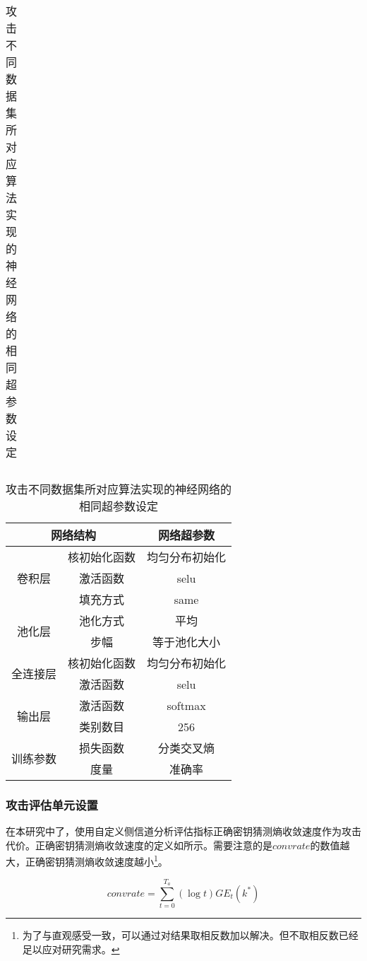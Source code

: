 {\begin{table}[!htb]
{\begin{subtable}[t]{\textwidth}
\begin{tabular}{cc|cccccc}
				\end{tabular}   
			\end{subtable}
		}
		
		\normalsize{
			\begin{subtable}[t]{\textwidth}
				\caption{攻击不同数据集所对应算法实现的神经网络的相同超参数设定}
				\centering
				\begin{tabular}{cc|c}
					\hline
					\multicolumn{2}{c|}{网络结构} &网络超参数\\
					\hline
					\multirow{3}{*}{卷积层 }     &核初始化函数    &均匀分布初始化      \\
					                             &激活函数  &selu     \\
					                             &填充方式  &same     \\
					\hline
					\multirow{2}{*}{池化层 }     &池化方式    &平均              \\
					                             &步幅  &等于池化大小     \\
					\hline
					\multirow{2}{*}{全连接层}    &核初始化函数    &均匀分布初始化          \\
					                            &激活函数  &selu     \\
					\hline
					\multirow{2}{*}{输出层}      &激活函数    &softmax          \\
					                             &类别数目    &256                  \\
					\hline
					\multirow{2}{*}{训练参数}      &损失函数    &分类交叉熵          \\
				 	                               &度量       &准确率                  \\
					\hline
				\end{tabular}
			\end{subtable}
		}
	\end{table}
	\subsubsection{攻击评估单元设置}
	在本研究中了，使用自定义侧信道分析评估指标正确密钥猜测熵收敛速度作为攻击代价。正确密钥猜测熵收敛速度的定义如所示。需要注意的是$convrate$的数值越大，正确密钥猜测熵收敛速度越小\footnote{为了与直观感受一致，可以通过对结果取相反数加以解决。但不取相反数已经足以应对研究需求。}。
	
	\begin{equation}\label{eq:mycost}
	convrate=\sum\limits_{t=0}^{T_a}(\log t)GE_t(k^*)
	\end{equation}
	
}
